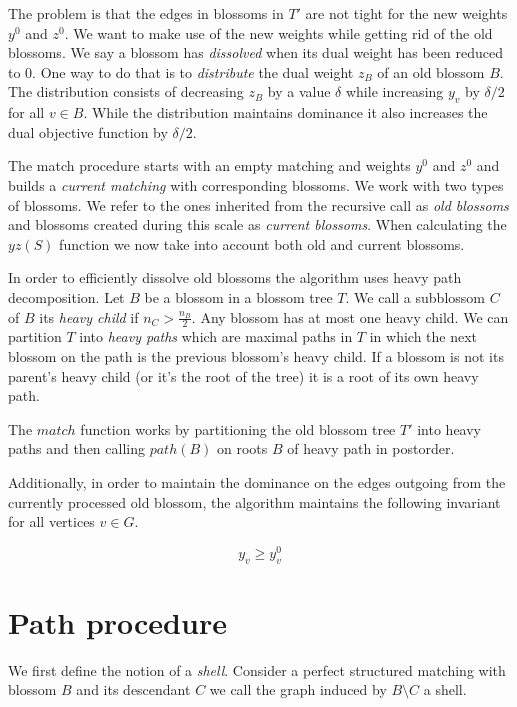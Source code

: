 The problem is that the edges in blossoms in $T'$ are not tight for the new weights $y^0$ and $z^0$. We want to make use of the new weights while getting rid of the old blossoms. We say a blossom has \textit{dissolved} when its dual weight has been reduced to $0$. One way to do that is to \textit{distribute} the dual weight $z_B$ of an old blossom $B$. The distribution consists of decreasing $z_B$ by a value $\delta$ while increasing $y_v$ by $\delta / 2$ for all $v \in B$. While the distribution maintains dominance it also increases the dual objective function by $\delta / 2$. 

The match procedure starts with an empty matching and weights $y^0$ and $z^0$ and builds a \textit{current matching} with corresponding blossoms. We work with two types of blossoms. We refer to the ones inherited from the recursive call as \textit{old blossoms} and blossoms created during this scale as \textit{current blossoms}. When calculating the $yz(S)$ function we now take into account both old and current blossoms.

In order to efficiently dissolve old blossoms the algorithm uses heavy path decomposition. Let $B$ be a blossom in a blossom tree $T$. We call a subblossom $C$ of $B$ its \textit{heavy child} if $n_C > \frac{n_B}{2}$. Any blossom has at most one heavy child. We can partition $T$ into \textit{heavy paths} which are maximal paths in $T$ in which the next blossom on the path is the previous blossom's heavy child. If a blossom is not its parent's heavy child (or it's the root of the tree) it is a root of its own heavy path.

The $match$ function works by partitioning the old blossom tree $T'$ into heavy paths and then calling $path(B)$ on roots $B$ of heavy path in postorder.

Additionally, in order to maintain the dominance on the edges outgoing from the currently processed old blossom, the algorithm maintains the following invariant for all vertices $v \in G$.

\begin{equation}\label{eq:4}
    y_v \geq y^0_v
\end{equation}

\section{Path procedure}

We first define the notion of a \textit{shell}. Consider a perfect structured matching with blossom $B$ and its descendant $C$ we call the graph induced by $B \setminus C$ a shell.

